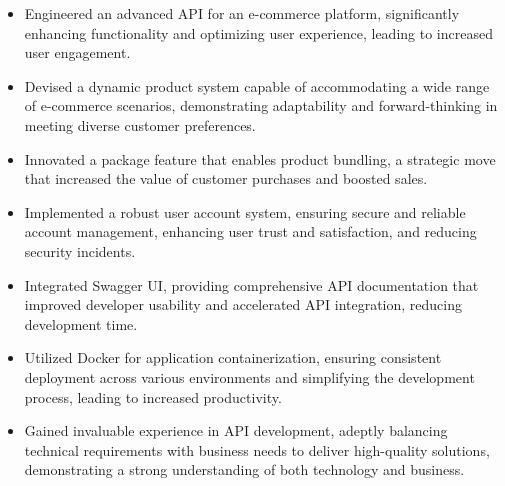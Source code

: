 \documentclass[10pt,a4paper]{altacv}
\begin{document}
\divider


\newpage

\begin{itemize}
    \item Engineered an advanced API for an e-commerce platform, significantly enhancing functionality and optimizing user experience, leading to increased user engagement.
    \item Devised a dynamic product system capable of accommodating a wide range of e-commerce scenarios, demonstrating adaptability and forward-thinking in meeting diverse customer preferences.
    \item Innovated a package feature that enables product bundling, a strategic move that increased the value of customer purchases and boosted sales.
    \item Implemented a robust user account system, ensuring secure and reliable account management, enhancing user trust and satisfaction, and reducing security incidents.
    \item Integrated Swagger UI, providing comprehensive API documentation that improved developer usability and accelerated API integration, reducing development time.
    \item Utilized Docker for application containerization, ensuring consistent deployment across various environments and simplifying the development process, leading to increased productivity.
    \item Gained invaluable experience in API development, adeptly balancing technical requirements with business needs to deliver high-quality solutions, demonstrating a strong understanding of both technology and business.
\end{itemize}
\end{document}
